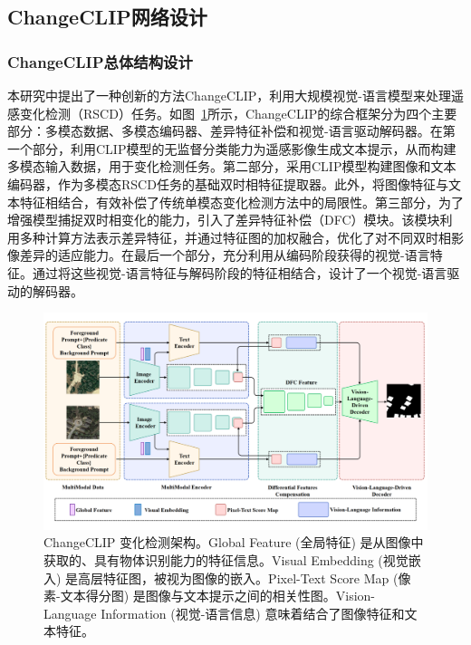 \subsection{ChangeCLIP网络设计}
\subsubsection{ChangeCLIP总体结构设计}
本研究中提出了一种创新的方法ChangeCLIP，利用大规模视觉-语言模型来处理遥感变化检测（RSCD）任务。如图~\ref{fig:changeclip3}所示，ChangeCLIP的综合框架分为四个主要部分：多模态数据、多模态编码器、差异特征补偿和视觉-语言驱动解码器。在第一个部分，利用CLIP模型的无监督分类能力为遥感影像生成文本提示，从而构建多模态输入数据，用于变化检测任务。第二部分，采用CLIP模型构建图像和文本编码器，作为多模态RSCD任务的基础双时相特征提取器。此外，将图像特征与文本特征相结合，有效补偿了传统单模态变化检测方法中的局限性。第三部分，为了增强模型捕捉双时相变化的能力，引入了差异特征补偿（DFC）模块。该模块利用多种计算方法表示差异特征，并通过特征图的加权融合，优化了对不同双时相影像差异的适应能力。在最后一个部分，充分利用从编码阶段获得的视觉-语言特征。通过将这些视觉-语言特征与解码阶段的特征相结合，设计了一个视觉-语言驱动的解码器。

\begin{figure}[!htbp]
  \centering
  \includegraphics[width=\textwidth]{paper_figures/基于AI基础模型微调的变化检测模型研究/ChangeCLIP/changeclip3.png}
  \caption{ChangeCLIP 变化检测架构。Global Feature (全局特征) 是从图像中获取的、具有物体识别能力的特征信息。Visual Embedding (视觉嵌入) 是高层特征图，被视为图像的嵌入。Pixel-Text Score Map (像素-文本得分图) 是图像与文本提示之间的相关性图。Vision-Language Information (视觉-语言信息) 意味着结合了图像特征和文本特征。}\label{fig:changeclip3}
\end{figure}

